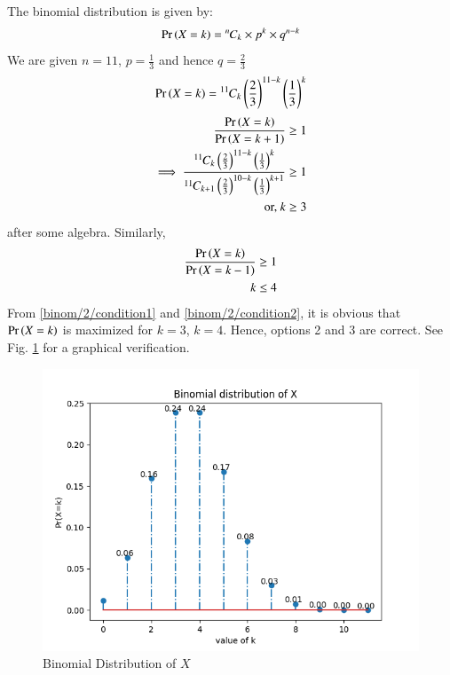 
The binomial distribution is given by:
\begin{equation}
\Pr\left(X=k\right)={{}^{n}\mkern-1muC_{k}}\times p^k\times q^{n-k}
\end{equation}
We are given $n=11$, $p=\frac{1}{3}$ and hence $q=\frac{2}{3}$
\begin{align}
\Pr\left(X = k\right)={{{}^{11}\mkern-1muC_{k}}}\left(\frac{2}{3}\right)^{11-k}\left(\frac{1}{3}\right)^{k}
\end{align}
\begin{align}
\frac{\Pr\left(X = k\right)}{\Pr\left(X = k+1\right)} &\geq1
\\
\implies \frac{{{{}^{11}\mkern-1muC_{k}}}\left(\frac{2}{3}\right)^{11-k}\left(\frac{1}{3}\right)^{k}}{{{{}^{11}\mkern-1muC_{k+1}}}\left(\frac{2}{3}\right)^{10-k}\left(\frac{1}{3}\right)^{k+1}}&\geq1
\\
\text{or, }k&\geq3
\label{binom/2/condition1}
\end{align}
after some algebra.  Similarly, 
\begin{align}
\frac{\Pr\left(X = k\right)}{\Pr\left(X = k-1\right)}& \geq 1\\
k&\leq4\label{binom/2/condition2}
\end{align}
From \eqref{binom/2/condition1} and \eqref{binom/2/condition2},  it is obvious that $\Pr\left(X = k\right)$ is maximized for $k=3$, $k=4$. Hence, options 2 and 3 are correct.  See Fig. 
\ref{binom/2/fig:binom dist} for a graphical verification.
\begin{figure}[!htb]
\centering
\includegraphics[width=\columnwidth]{binomial/solutions/2/Binomial-stemplot.png}
\caption{Binomial Distribution of  $X$}
\label{binom/2/fig:binom dist}
\end{figure}

